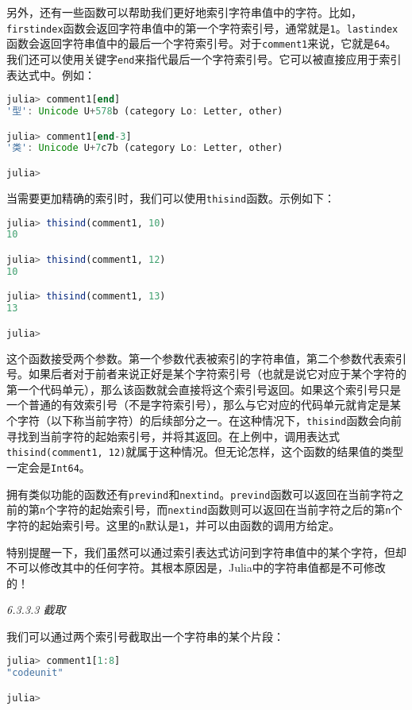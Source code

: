 另外，还有一些函数可以帮助我们更好地索引字符串值中的字符。比如，\verb`firstindex`函数会返回字符串值中的第一个字符索引号，通常就是\verb`1`。\verb`lastindex`函数会返回字符串值中的最后一个字符索引号。对于\verb`comment1`来说，它就是\verb`64`。我们还可以使用关键字\verb`end`来指代最后一个字符索引号。它可以被直接应用于索引表达式中。例如：
\begin{lstlisting}[language=julia]
julia> comment1[end]
'型': Unicode U+578b (category Lo: Letter, other)

julia> comment1[end-3]
'类': Unicode U+7c7b (category Lo: Letter, other)

julia> 
\end{lstlisting}

当需要更加精确的索引时，我们可以使用\verb`thisind`函数。示例如下：
\begin{lstlisting}[language=julia]
julia> thisind(comment1, 10)
10

julia> thisind(comment1, 12)
10

julia> thisind(comment1, 13)
13

julia> 
\end{lstlisting}

这个函数接受两个参数。第一个参数代表被索引的字符串值，第二个参数代表索引号。如果后者对于前者来说正好是某个字符索引号（也就是说它对应于某个字符的第一个代码单元），那么该函数就会直接将这个索引号返回。如果这个索引号只是一个普通的有效索引号（不是字符索引号），那么与它对应的代码单元就肯定是某个字符（以下称当前字符）的后续部分之一。在这种情况下，\verb`thisind`函数会向前寻找到当前字符的起始索引号，并将其返回。在上例中，调用表达式\verb`thisind(comment1, 12)`就属于这种情况。但无论怎样，这个函数的结果值的类型一定会是\verb`Int64`。

拥有类似功能的函数还有\verb`prevind`和\verb`nextind`。\verb`prevind`函数可以返回在当前字符之前的第\verb`n`个字符的起始索引号，而\verb`nextind`函数则可以返回在当前字符之后的第\verb`n`个字符的起始索引号。这里的\verb`n`默认是\verb`1`，并可以由函数的调用方给定。

特别提醒一下，我们虽然可以通过索引表达式访问到字符串值中的某个字符，但却不可以修改其中的任何字符。其根本原因是，Julia中的字符串值都是不可修改的！

\textsl{6.3.3.3 截取}

我们可以通过两个索引号截取出一个字符串的某个片段：
\begin{lstlisting}[language=julia]
julia> comment1[1:8]
"codeunit"

julia> 
\end{lstlisting}

